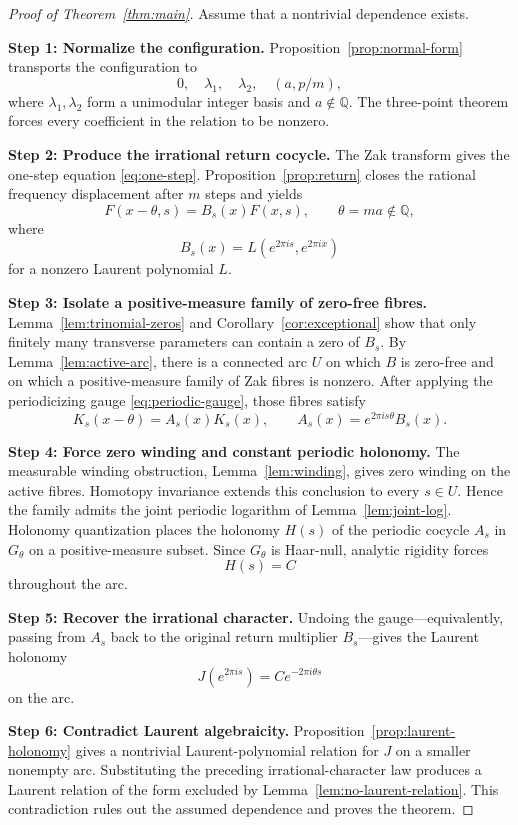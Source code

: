\documentclass[reqno]{amsart}
\theoremstyle{remark}
\numberwithin{equation}{section}
\newcommand{\Q}{\mathbb{Q}}
\begin{document}
\begin{proof}[Proof of Theorem~\ref{thm:main}]
Assume that a nontrivial dependence exists.

\smallskip
\noindent
\textbf{Step 1: Normalize the configuration.}
Proposition~\ref{prop:normal-form} transports the configuration to
\[
  0,\quad \lambda_1,\quad \lambda_2,\quad (a,p/m),
\]
where \(\lambda_1,\lambda_2\) form a unimodular integer basis and
\(a\notin\Q\). The three-point theorem forces every coefficient in the
relation to be nonzero.

\smallskip
\noindent
\textbf{Step 2: Produce the irrational return cocycle.}
The Zak transform gives the one-step equation \eqref{eq:one-step}.
Proposition~\ref{prop:return} closes the rational frequency displacement after
\(m\) steps and yields
\[
  F(x-\theta,s)=B_s(x)F(x,s),
  \qquad \theta=ma\notin\Q,
\]
where
\[
  B_s(x)=L(e^{2\pi i s},e^{2\pi i x})
\]
for a nonzero Laurent polynomial \(L\).

\smallskip
\noindent
\textbf{Step 3: Isolate a positive-measure family of zero-free fibres.}
Lemma~\ref{lem:trinomial-zeros} and Corollary~\ref{cor:exceptional} show that
only finitely many transverse parameters can contain a zero of \(B_s\). By
Lemma~\ref{lem:active-arc}, there is a connected arc \(U\) on which \(B\) is
zero-free and on which a positive-measure family of Zak fibres is nonzero.
After applying the periodicizing gauge \eqref{eq:periodic-gauge}, those
fibres satisfy
\[
  K_s(x-\theta)=A_s(x)K_s(x),
  \qquad A_s(x)=e^{2\pi i s\theta}B_s(x).
\]

\smallskip
\noindent
\textbf{Step 4: Force zero winding and constant periodic holonomy.}
The measurable winding obstruction, Lemma~\ref{lem:winding}, gives zero
winding on the active fibres. Homotopy invariance extends this conclusion to
every \(s\in U\). Hence the family admits the joint periodic logarithm of
Lemma~\ref{lem:joint-log}. Holonomy quantization places the holonomy \(H(s)\)
of the periodic cocycle \(A_s\) in \(G_\theta\) on a positive-measure subset.
Since
\(G_\theta\) is Haar-null, analytic rigidity forces
\[
  H(s)=C
\]
throughout the arc.

\smallskip
\noindent
\textbf{Step 5: Recover the irrational character.}
Undoing the gauge---equivalently, passing from \(A_s\) back to the original
return multiplier \(B_s\)---gives the Laurent holonomy
\[
  J(e^{2\pi i s})=Ce^{-2\pi i\theta s}
\]
on the arc.

\smallskip
\noindent
\textbf{Step 6: Contradict Laurent algebraicity.}
Proposition~\ref{prop:laurent-holonomy} gives a nontrivial Laurent-polynomial
relation for \(J\) on a smaller nonempty arc. Substituting the preceding
irrational-character law produces a Laurent relation of the form excluded by
Lemma~\ref{lem:no-laurent-relation}. This contradiction rules out the assumed
dependence and proves the theorem.
\end{proof}
\end{document}
